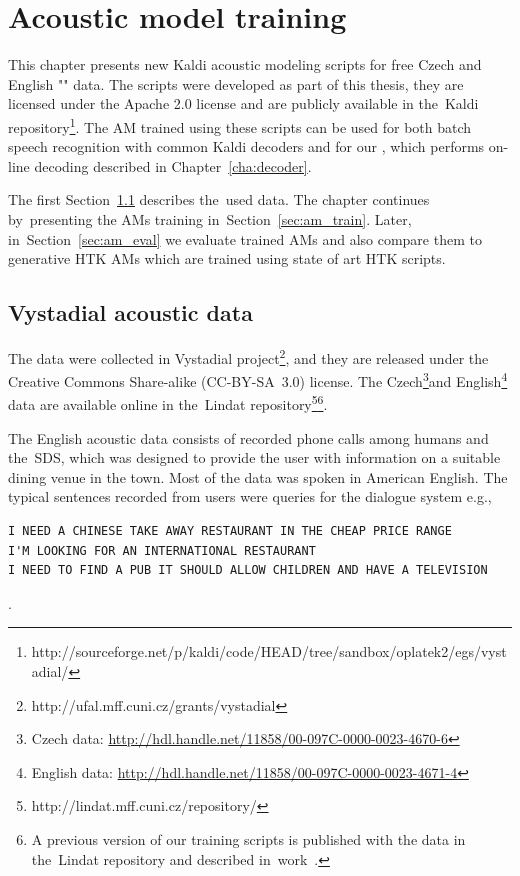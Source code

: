 \chapter{Acoustic model training}
\label{cha:train}

This chapter presents new Kaldi acoustic modeling scripts for free Czech and English "" data.
The scripts were developed as part of this thesis, they are licensed under the Apache 2.0 license and are publicly available in the~Kaldi repository\footnote{http://sourceforge.net/p/kaldi/code/HEAD/tree/sandbox/oplatek2/egs/vystadial/}.
The \acf{AM} trained using these scripts can be used for both batch speech recognition with common Kaldi decoders and for our , which performs on-line decoding described in Chapter~\ref{cha:decoder}.

The first Section~\ref{sec:data} describes the~used data. 
The chapter continues by~presenting the \acp{AM} training in~Section~\ref{sec:am_train}. 
Later, in~Section~\ref{sec:am_eval} we evaluate trained \acp{AM} and also compare them to generative \ac{HTK} \acp{AM} which are trained using state of art \ac{HTK} scripts.

\section{Vystadial acoustic data}
\label{sec:data}

The data were collected in Vystadial project\footnote{http://ufal.mff.cuni.cz/grants/vystadial}, and they are released under the Creative Commons Share-alike (CC-BY-SA~3.0) license. 
The Czech\footnote{Czech data: \url{http://hdl.handle.net/11858/00-097C-0000-0023-4670-6}}and English\footnote{English data: \url{http://hdl.handle.net/11858/00-097C-0000-0023-4671-4}} data are available online in the~Lindat repository\footnote{{http://lindat.mff.cuni.cz/repository/}}\footnote{A previous version of our training scripts is published with the data in the~Lindat repository and described in~work~\cite{korvas_2014}.}.

The English acoustic data consists of recorded phone calls among humans and the~\acl{SDS}, which was designed to provide the user with information on a suitable dining venue in the town.
Most of the data was spoken in American English.
The typical sentences recorded from users were queries for the dialogue system e.g.,
\begin{verbatim}
I NEED A CHINESE TAKE AWAY RESTAURANT IN THE CHEAP PRICE RANGE
I'M LOOKING FOR AN INTERNATIONAL RESTAURANT
I NEED TO FIND A PUB IT SHOULD ALLOW CHILDREN AND HAVE A TELEVISION
\end{verbatim}.

